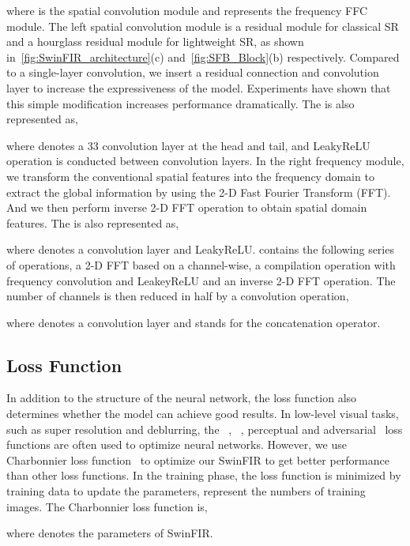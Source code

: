 \documentclass[10pt,twocolumn,letterpaper]{article}
\begin{document}
where  is the spatial convolution module and  represents the frequency FFC module. The left spatial convolution module is a residual module for classical SR and a hourglass residual module for lightweight SR, as shown in~\ref{fig:SwinFIR_architecture}(c) and~\ref{fig:SFB_Block}(b) respectively. Compared to a single-layer convolution, we insert a residual connection and convolution layer to increase the expressiveness of the model. Experiments have shown that this simple modification increases performance dramatically. The  is also represented as,

where  denotes a 33 convolution layer at the head and tail, and LeakyReLU operation is conducted between convolution layers. In the right frequency module, we transform the conventional spatial features into the frequency domain to extract the global information by using the 2-D Fast Fourier Transform (FFT). And we then perform inverse 2-D FFT operation to obtain spatial domain features. The  is also represented as,

where  denotes a convolution layer and LeakyReLU.  contains the following series of operations, a 2-D FFT based on a channel-wise, a compilation operation with frequency convolution and LeakeyReLU and an inverse 2-D FFT operation. The number of channels is then reduced in half by a convolution operation,

where  denotes a convolution layer and  stands for the concatenation operator.

\subsection{Loss Function}
In addition to the structure of the neural network, the loss function also determines whether the model can achieve good results. In low-level visual tasks, such as super resolution and deblurring, the ~\cite{dong2016accelerating}, ~\cite{zhang2018image}, perceptual and adversarial~\cite{sajjadi2017enhancenet} loss functions are often used to optimize neural networks. However, we use Charbonnier loss function~\cite{lai2018fast} to optimize our SwinFIR to get better performance than other loss functions. In the training phase, the loss function is minimized by training data  to update the parameters,  represent the numbers of training images. The Charbonnier loss function is,

where  denotes the parameters of SwinFIR.
\end{document}
